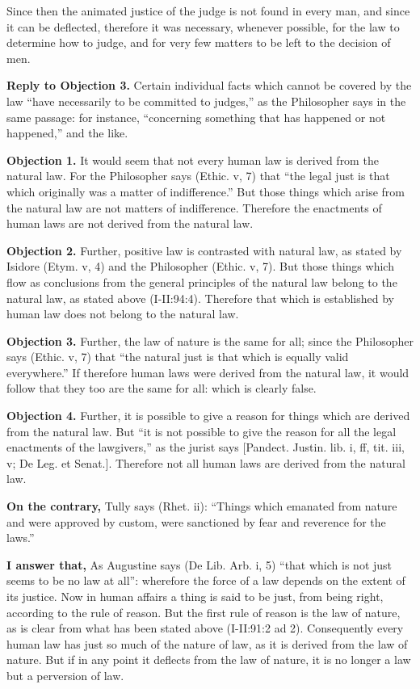 Since then the animated justice of the judge is not found in every man, and since it can be deflected, therefore it was necessary, whenever possible, for the law to determine how to judge, and for very few matters to be left to the decision of men.

\textbf{Reply to Objection 3.} Certain individual facts which cannot be covered by the law ``have necessarily to be committed to judges,'' as the Philosopher says in the same passage: for instance, ``concerning something that has happened or not happened,'' and the like.


\textbf{Objection 1.} It would seem that not every human law is derived from the natural law. For the Philosopher says (Ethic. v, 7) that ``the legal just is that which originally was a matter of indifference.'' But those things which arise from the natural law are not matters of indifference. Therefore the enactments of human laws are not derived from the natural law.

\textbf{Objection 2.} Further, positive law is contrasted with natural law, as stated by Isidore (Etym. v, 4) and the Philosopher (Ethic. v, 7). But those things which flow as conclusions from the general principles of the natural law belong to the natural law, as stated above (I-II:94:4). Therefore that which is established by human law does not belong to the natural law.

\textbf{Objection 3.} Further, the law of nature is the same for all; since the Philosopher says (Ethic. v, 7) that ``the natural just is that which is equally valid everywhere.'' If therefore human laws were derived from the natural law, it would follow that they too are the same for all: which is clearly false.

\textbf{Objection 4.} Further, it is possible to give a reason for things which are derived from the natural law. But ``it is not possible to give the reason for all the legal enactments of the lawgivers,'' as the jurist says [Pandect. Justin. lib. i, ff, tit. iii, v; De Leg. et Senat.]. Therefore not all human laws are derived from the natural law.

\textbf{On the contrary,} Tully says (Rhet. ii): ``Things which emanated from nature and were approved by custom, were sanctioned by fear and reverence for the laws.''

\textbf{I answer that,} As Augustine says (De Lib. Arb. i, 5) ``that which is not just seems to be no law at all'': wherefore the force of a law depends on the extent of its justice. Now in human affairs a thing is said to be just, from being right, according to the rule of reason. But the first rule of reason is the law of nature, as is clear from what has been stated above (I-II:91:2 ad 2). Consequently every human law has just so much of the nature of law, as it is derived from the law of nature. But if in any point it deflects from the law of nature, it is no longer a law but a perversion of law.

